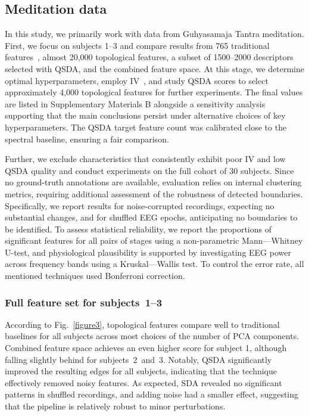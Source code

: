 \documentclass[pdflatex,sn-basic,Numbered]{sn-jnl}
\begin{document}
\subsection{Meditation data}\label{meditation_results}

In this study, we primarily work with data from Guhyasamaja Tantra meditation. First, we focus on subjects 1--3 and compare results from 765 traditional features~\cite{SDA}, almost 20,000 topological features, a subset of 1500--2000 descriptors selected with QSDA, and the combined feature space. At this stage, we determine optimal hyperparameters, employ IV~\cite{InformationValue}, and study QSDA scores to select approximately 4,000 topological features for further experiments. The final values are listed in Supplementary Materials B alongside a sensitivity analysis supporting that the main conclusions persist under alternative choices of key hyperparameters. The QSDA target feature count was calibrated close to the spectral baseline, ensuring a fair comparison.

Further, we exclude characteristics that consistently exhibit poor IV and low QSDA quality and conduct experiments on the full cohort of 30 subjects. Since no ground-truth annotations are available, evaluation relies on internal clustering metrics, requiring additional assessment of the robustness of detected boundaries. Specifically, we report results for noise-corrupted recordings, expecting no substantial changes, and for shuffled EEG epochs, anticipating no boundaries to be identified. To assess statistical reliability, we report the proportions of significant features for all pairs of stages using a non-parametric Mann---Whitney U-test, and physiological plausibility is supported by investigating EEG power across frequency bands using a Kruskal---Wallis test. To control the error rate, all mentioned techniques used Bonferroni correction.

\subsubsection{Full feature set for subjects~1--3}

According to Fig.~\ref{figure3}, topological features compare well to traditional baselines for all subjects across most choices of the number of PCA components. Combined feature space achieves an even higher score for subject 1, although falling slightly behind for subjects~2~and~3. Notably, QSDA significantly improved the resulting edges for all subjects, indicating that the technique effectively removed noisy features. As expected, SDA revealed no significant patterns in shuffled recordings, and adding noise had a smaller effect, suggesting that the pipeline is relatively robust to minor perturbations.
\end{document}
